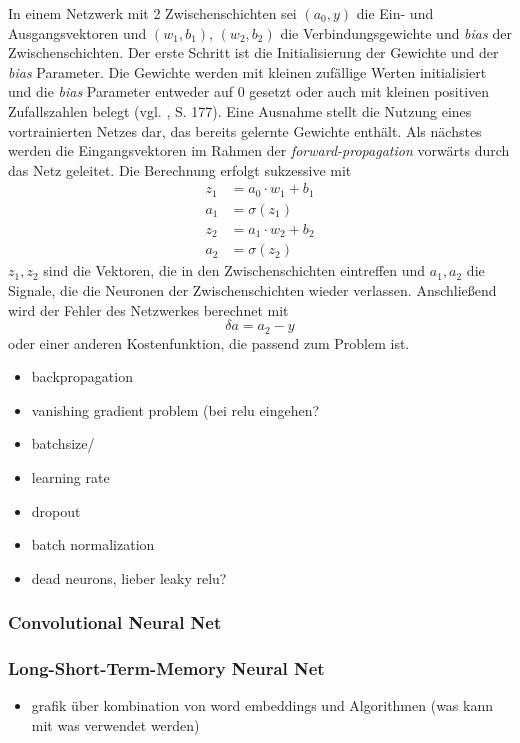 \documentclass[a4paper,11pt]{article}
\begin{document}
In einem Netzwerk mit 2 Zwischenschichten sei $(a_0, y)$ die Ein- und Ausgangsvektoren und $(w_1, b_1)$, $(w_2, b_2)$ die Verbindungsgewichte und \textit{bias} der Zwischenschichten. Der erste Schritt ist die Initialisierung der Gewichte und der \textit{bias} Parameter. Die Gewichte werden mit kleinen zufällige Werten initialisiert und die \textit{bias} Parameter entweder auf $0$ gesetzt oder auch mit kleinen positiven Zufallszahlen belegt (vgl. \cite{deepL}, S. 177). Eine Ausnahme stellt die Nutzung eines vortrainierten Netzes dar, das bereits gelernte Gewichte enthält. Als nächstes werden die Eingangsvektoren im Rahmen der \textit{forward-propagation} vorwärts durch das Netz geleitet. Die Berechnung erfolgt sukzessive mit
\begin{align*}
    z_1 &= a_0 \cdot w_1 + b_1 \\
    a_1 &= \sigma(z_1) \\
    z_2 &= a_1 \cdot w_2 + b_2 \\
    a_2 &= \sigma (z_2)
\end{align*}{}
$z_1, z_2$ sind die Vektoren, die in den Zwischenschichten eintreffen und $a_1, a_2$ die Signale, die die Neuronen der Zwischenschichten wieder verlassen. Anschließend wird der Fehler des Netzwerkes berechnet mit 
\[ \delta a = a_2 - y \]
oder einer anderen Kostenfunktion, die passend zum Problem ist.

\begin{itemize}
    \item backpropagation
    \item vanishing gradient problem (bei relu eingehen?
    \item batchsize/
    \item learning rate
    \item dropout
    \item batch normalization
    \item dead neurons, lieber leaky relu?
\end{itemize}{}


\subsubsection{Convolutional Neural Net}
\subsubsection{Long-Short-Term-Memory Neural Net}

\begin{itemize}
    \item grafik über kombination von word embeddings und Algorithmen (was kann mit was verwendet werden)
\end{itemize}{}
\end{document}
